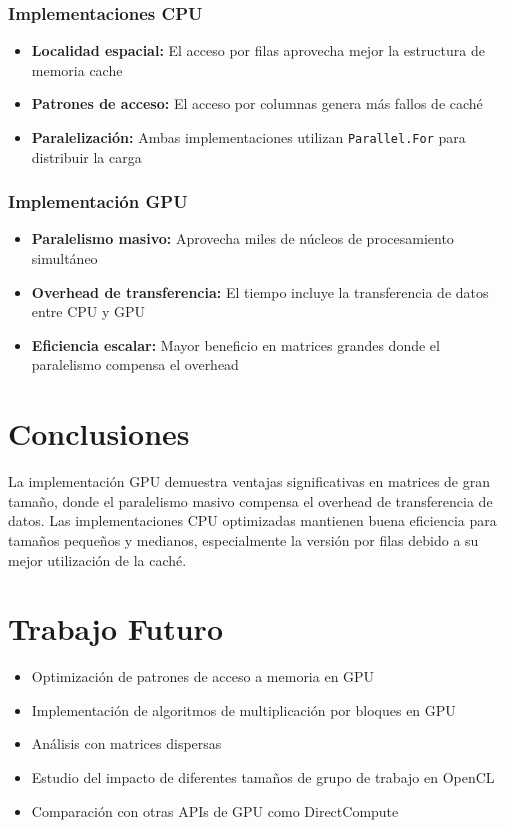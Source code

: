 \documentclass[11pt]{article}
\begin{document}
\subsubsection{Implementaciones CPU}
\begin{itemize}
    \item \textbf{Localidad espacial:} El acceso por filas aprovecha mejor la estructura de memoria cache
    \item \textbf{Patrones de acceso:} El acceso por columnas genera más fallos de caché
    \item \textbf{Paralelización:} Ambas implementaciones utilizan \texttt{Parallel.For} para distribuir la carga
\end{itemize}

\subsubsection{Implementación GPU}
\begin{itemize}
    \item \textbf{Paralelismo masivo:} Aprovecha miles de núcleos de procesamiento simultáneo
    \item \textbf{Overhead de transferencia:} El tiempo incluye la transferencia de datos entre CPU y GPU
    \item \textbf{Eficiencia escalar:} Mayor beneficio en matrices grandes donde el paralelismo compensa el overhead
\end{itemize}

\section{Conclusiones}
La implementación GPU demuestra ventajas significativas en matrices de gran tamaño, donde el paralelismo masivo compensa el overhead de transferencia de datos. Las implementaciones CPU optimizadas mantienen buena eficiencia para tamaños pequeños y medianos, especialmente la versión por filas debido a su mejor utilización de la caché.

\section{Trabajo Futuro}
\begin{itemize}
    \item Optimización de patrones de acceso a memoria en GPU
    \item Implementación de algoritmos de multiplicación por bloques en GPU
    \item Análisis con matrices dispersas
    \item Estudio del impacto de diferentes tamaños de grupo de trabajo en OpenCL
    \item Comparación con otras APIs de GPU como DirectCompute
\end{itemize}
\end{document}
